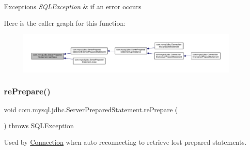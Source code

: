 \begin{DoxyExceptions}{Exceptions}
{\em S\+Q\+L\+Exception} & if an error occurs \\
\hline
\end{DoxyExceptions}
Here is the caller graph for this function\+:
\nopagebreak
\begin{figure}[H]
\begin{center}
\leavevmode
\includegraphics[width=350pt]{classcom_1_1mysql_1_1jdbc_1_1_server_prepared_statement_af12056e4aca4279abd972fbbba2f320f_icgraph}
\end{center}
\end{figure}
\mbox{\label{classcom_1_1mysql_1_1jdbc_1_1_server_prepared_statement_ac01f8aa54deb0cea5d132b02377feb5b}} 
\subsubsection{\texorpdfstring{re\+Prepare()}{rePrepare()}}
{\footnotesize\ttfamily void com.\+mysql.\+jdbc.\+Server\+Prepared\+Statement.\+re\+Prepare (\begin{DoxyParamCaption}{ }\end{DoxyParamCaption}) throws S\+Q\+L\+Exception\hspace{0.3cm}{\ttfamily [protected]}}

Used by \mbox{\hyperlink{interfacecom_1_1mysql_1_1jdbc_1_1_connection}{Connection}} when auto-\/reconnecting to retrieve \textquotesingle{}lost\textquotesingle{} prepared statements.


